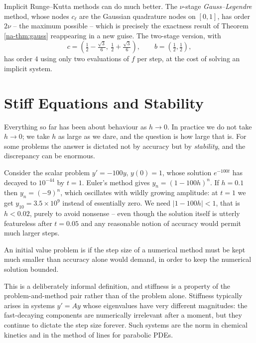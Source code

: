 \documentclass[a4paper]{scrartcl}
\providecommand{\abs}[1]{\left\lvert#1\right\rvert}
\renewcommand{\abs}[1]{\left\lvert#1\right\rvert}
\begin{document}
\begin{remark}
  Implicit Runge--Kutta methods can do much better. The $\nu$-stage \emph{Gauss--Legendre} method, whose nodes $c_\ell$ are the Gaussian quadrature nodes on $[0,1]$, has order $2\nu$ -- the maximum possible -- which is precisely the exactness result of Theorem \ref{na-thm:gauss} reappearing in a new guise. The two-stage version, with
  $$
  c = \left(\tfrac12 - \tfrac{\sqrt3}{6},\ \tfrac12 + \tfrac{\sqrt3}{6}\right), \qquad b = \left(\tfrac12, \tfrac12\right),
  $$
  has order $4$ using only two evaluations of $f$ per step, at the cost of solving an implicit system.
\end{remark}


\section{Stiff Equations and Stability}\label{sec:stiff}

Everything so far has been about behaviour as $h \to 0$. In practice we do not take $h \to 0$; we take $h$ as large as we dare, and the question is how large that is. For some problems the answer is dictated not by accuracy but by \emph{stability}, and the discrepancy can be enormous.

\begin{example}
  Consider the scalar problem $y' = -100y$, $y(0) = 1$, whose solution $e^{-100t}$ has decayed to $10^{-44}$ by $t = 1$. Euler's method gives $y_n = (1-100h)^n$. If $h = 0.1$ then $y_n = (-9)^n$, which oscillates with wildly growing amplitude: at $t=1$ we get $y_{10} = 3.5\times 10^{9}$ instead of essentially zero. We need $\abs{1 - 100h} < 1$, that is $h < 0.02$, purely to avoid nonsense -- even though the solution itself is utterly featureless after $t = 0.05$ and any reasonable notion of accuracy would permit much larger steps.
\end{example}

\begin{definition}[Stiffness]
  An initial value problem is  if the step size of a numerical method must be kept much smaller than accuracy alone would demand, in order to keep the numerical solution bounded.
\end{definition}

This is a deliberately informal definition, and stiffness is a property of the problem-and-method pair rather than of the problem alone. Stiffness typically arises in systems $y' = Ay$ whose eigenvalues have very different magnitudes: the fast-decaying components are numerically irrelevant after a moment, but they continue to dictate the step size forever. Such systems are the norm in chemical kinetics and in the method of lines for parabolic PDEs.
\end{document}
